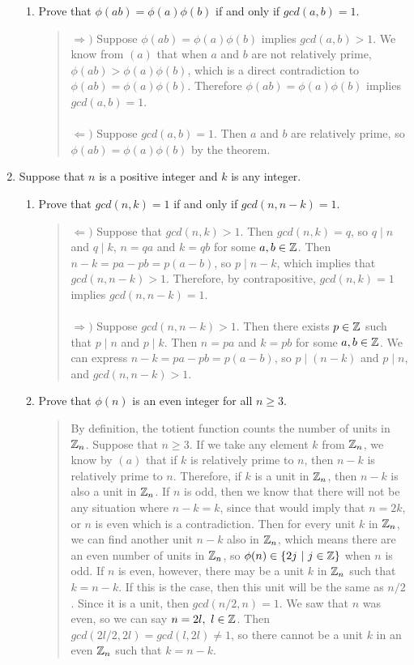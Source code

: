 \documentclass{hw}
\begin{document}
\begin{enumerate}
\begin{enumerate}
\item Prove that $\phi(ab) = \phi(a)\phi(b)$ if and only if $gcd(a,b)=1$.
\begin{quote}
$\Rightarrow)$ Suppose $\phi(ab) = \phi(a)\phi(b)$ implies $gcd(a,b)>1$. We know from $(a)$ that
when $a$ and $b$ are not relatively prime, $\phi(ab) > \phi(a)\phi(b)$, which is a direct contradiction
to $\phi(ab) = \phi(a)\phi(b)$. Therefore $\phi(ab) = \phi(a)\phi(b)$ implies $gcd(a,b)=1$.
\noindent\\\\
$\Leftarrow)$ Suppose $gcd(a,b)=1$. Then $a$ and $b$ are relatively prime, so
$\phi(ab)=\phi(a)\phi(b)$ by the theorem.
\end{quote}
\end{enumerate}

\item Suppose that $n$ is a positive integer and $k$ is any integer.
\begin{enumerate}
\item Prove that $gcd(n,k)=1$ if and only if $gcd(n,n-k)=1$.
\begin{quote}
$\Leftarrow)$ Suppose that $gcd(n,k)>1$. Then $gcd(n,k)=q$, so $q\mid n$ and
$q\mid k$, $n=qa$ and $k=qb$ for some $a,b\in\mathbb{Z}$. Then $n-k=pa-pb=p(a-b)$, so $p\mid n-k$, which
implies that $gcd(n,n-k)>1$. Therefore, by contrapositive, $gcd(n,k)=1$ implies $gcd(n,n-k)=1$.
\noindent\\\\
$\Rightarrow)$ Suppose $gcd(n,n-k)>1$. Then there exists $p\in\mathbb{Z}$ such that $p\mid n$ and $p\mid k$.
Then $n=pa$ and $k=pb$ for some $a,b\in\mathbb{Z}$. We can express $n-k=pa-pb=p(a-b)$, so $p\mid(n-k)$ and
$p\mid n$, and $gcd(n,n-k)>1$.
\end{quote}
\item Prove that $\phi(n)$ is an even integer for all $n\geq3$.
\begin{quote}
By definition, the totient function counts the number of units in $\mathbb{Z}_{n}$. Suppose that
$n\geq3$. If we take any element $k$ from $\mathbb{Z}_{n}$, we know by $(a)$ that if $k$ is relatively
prime to $n$, then $n-k$ is relatively prime to $n$. Therefore, if $k$ is a unit in $\mathbb{Z}_{n}$, then
$n-k$ is also a unit in $\mathbb{Z}_{n}$. If $n$ is odd, then we know that there will not be any situation
where $n-k=k$, since that would imply that $n=2k$, or $n$ is even which is a contradiction. Then for
every unit $k$ in $\mathbb{Z}_{n}$, we can find another unit $n-k$ also in $\mathbb{Z}_{n}$, which means there are
an even number of units in $\mathbb{Z}_{n}$, so $\phi(n)\in\{ 2j\ |\ j\in\mathbb{Z} \}$ when $n$ is odd. If $n$
is even, however, there may be a unit $k$ in $\mathbb{Z}_{n}$ such that $k=n-k$. If this is the case,
then this unit will be the same as $n/2$. Since it is a unit, then $gcd(n/2,n)=1$. We saw that
$n$ was even, so we can say $n=2l,\ l\in\ZZ$. Then $gcd(2l/2,2l)=gcd(l,2l)\neq1$, so there cannot
be a unit $k$ in an even $\mathbb{Z}_{n}$ such that $k=n-k$.
\end{quote}
\end{enumerate}


\end{enumerate}
\end{document}
